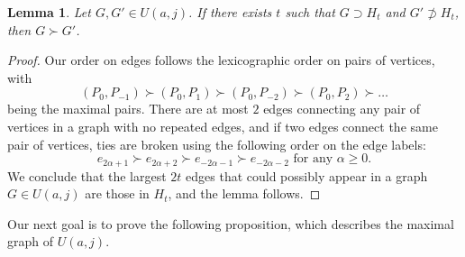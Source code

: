 \documentclass{amsproc}
\newtheorem{lemma}[theorem]{Lemma}
\theoremstyle{definition}
\theoremstyle{remark}
\numberwithin{equation}{section}
\begin{document}
\begin{lemma}\label{max_subgraphs}
Let $G,G'\in U(a,j)$. If there exists $t$ such that $G \supset H_t$ and $G'\not\supset H_t$, then $G \succ G'$.
\end{lemma}

\begin{proof}
Our order on edges follows the lexicographic order on pairs of vertices, with
\[(P_0,P_{-1})\succ (P_0,P_1)\succ (P_0,P_{-2})\succ (P_0,P_2)\succ \dots\]
being the maximal pairs.
There are at most $2$ edges connecting any pair of vertices in a graph with no repeated edges, and if two edges connect the same pair of vertices, 
ties are broken using the following order on the edge labels:
\[ \text{$e_{2\alpha+1}\succ e_{2\alpha+2}\succ e_{-2\alpha-1}\succ e_{-2\alpha-2}$ for any $\alpha\geqslant 0$.} \]
We conclude that the largest $2t$ edges that could possibly appear in a graph $G \in U(a, j)$
are those in $H_t$, and the lemma follows.
\end{proof}

Our next goal is to prove the following proposition, which describes the maximal graph of $U(a,j)$.
\end{document}
